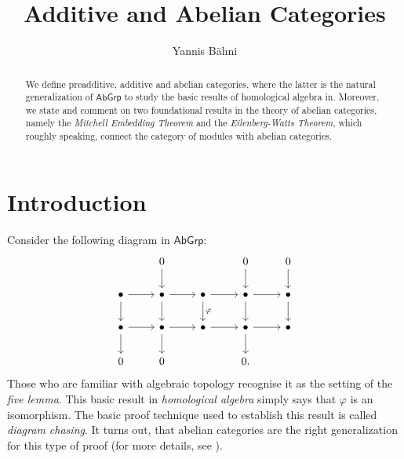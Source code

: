 

\title{Additive and Abelian Categories}
\author{Yannis B\"{a}hni}
\address[Yannis B\"{a}hni]{University of Zurich, R\"{a}mistrasse 71, 8006 Zurich}



\begin{abstract}
	We define preadditive, additive and abelian categories, where the latter is the natural generalization of $\mathsf{AbGrp}$ to study the basic results of homological algebra in. Moreover, we state and comment on two foundational results in the theory of abelian categories, namely the \emph{Mitchell Embedding Theorem} and the \emph{Eilenberg-Watts Theorem}, which roughly speaking, connect the category of modules with abelian categories.
\end{abstract}

\maketitle

\tableofcontents

\section{Introduction}
Consider the following diagram in $\mathsf{AbGrp}$:
\begin{equation*}
	\begin{tikzcd}
		& 0\arrow[d] & & 0\arrow[d] & 0\arrow[d]\\
		\bullet \arrow[d]\arrow[r] & \bullet \arrow[r]\arrow[d] & \bullet \arrow[r]\arrow[d,"\varphi"] & \bullet \arrow[r]\arrow[d] & \bullet \arrow[d]\\
		\bullet \arrow[r]\arrow[d] & \bullet \arrow[r]\arrow[d] & \bullet \arrow[r] & \bullet \arrow[r]\arrow[d] & \bullet\\
		0 & 0 & & 0.
	\end{tikzcd}
\end{equation*}
Those who are familiar with algebraic topology recognise it as the setting of the \emph{five lemma}. This basic result in \emph{homological algebra} simply says that $\varphi$ is an isomorphism. The basic proof technique used to establish this result is called \emph{diagram chasing}. It turns out, that abelian categories are the right generalization for this type of proof (for more details, see \cite[202--208]{maclane:categories:1978}).

